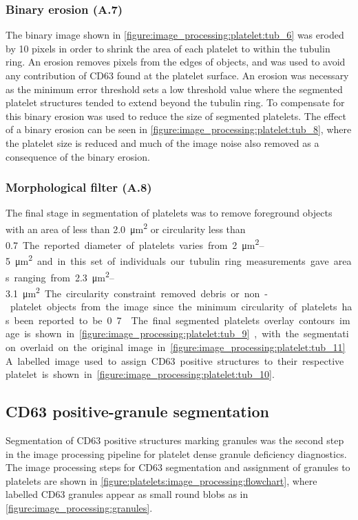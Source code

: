 \subsubsection{Binary erosion (A.7)}
The binary image shown in \autoref{figure:image_processing:platelet:tub_6} was eroded by 10 pixels in order to shrink the area of each platelet to within the tubulin ring. An erosion removes pixels from the edges of objects, and was used to avoid any contribution of CD63 found at the platelet surface. An erosion was necessary as the minimum error threshold sets a low threshold value where the segmented platelet structures tended to extend beyond the tubulin ring. To compensate for this binary erosion was used to reduce the size of segmented platelets. The effect of a binary erosion can be seen in \autoref{figure:image_processing:platelet:tub_8}, where the platelet size is reduced and much of the image noise also removed as a consequence of the binary erosion.

\subsubsection{Morphological filter (A.8)}
The final stage in segmentation of platelets was to remove foreground objects with an area of less than \SI{2.0}{\micro\meter\squared} or circularity less than \SI{0.7}. The reported diameter of platelets varies from \SIrange{2}{5}{\micro\meter\squared} and in this set of individuals our tubulin ring measurements gave areas ranging from \SIrange{2.3}{3.1}{\micro\meter\squared}. The circularity constraint removed debris or non-platelet objects from the image since the minimum circularity of platelets has been reported to be 0.7~\cite{Kraus2013}. The final segmented platelets overlay contours image is shown in \autoref{figure:image_processing:platelet:tub_9}, with the segmentation overlaid on the original image in \autoref{figure:image_processing:platelet:tub_11}. A labelled image used to assign CD63 positive structures to their respective platelet is shown in \autoref{figure:image_processing:platelet:tub_10}.

\subsection{CD63 positive-granule segmentation}
\label{platelets:image_processing:granules}
Segmentation of CD63 positive structures marking granules was the second step in the image processing pipeline for platelet dense granule deficiency diagnostics. The image processing steps for CD63 segmentation and assignment of granules to platelets are shown in \autoref{figure:platelets:image_processing:flowchart}, where labelled CD63 granules appear as small round blobs as in \autoref{figure:image_processing:granules}.

